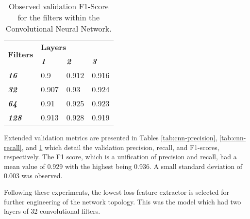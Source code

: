 \documentclass{article}
\begin{document}
\begin{table}[] \footnotesize
\centering
\caption{Observed validation F1-Score for the filters within the Convolutional Neural Network.}
\label{tab:cnn-f1}
\begin{tabular}{@{}llll@{}}
\toprule
\multirow{2}{*}{\textbf{Filters}} & \multicolumn{3}{l}{\textbf{Layers}}                             \\ \cmidrule(l){2-4} 
                                  & \textit{\textbf{1}} & \textit{\textbf{2}} & \textit{\textbf{3}} \\ \cmidrule(r){1-1}
\textit{\textbf{16}}              & 0.9                 & 0.912               & 0.916               \\
\textit{\textbf{32}}              & 0.907               & 0.93                & 0.924               \\
\textit{\textbf{64}}              & 0.91                & 0.925               & 0.923               \\
\textit{\textbf{128}}             & 0.913               & 0.928               & 0.919               \\ \bottomrule
\end{tabular}
\end{table}

Extended validation metrics are presented in Tables \ref{tab:cnn-precision}, \ref{tab:cnn-recall}, and \ref{tab:cnn-f1} which detail the validation precision, recall, and F1-scores, respectively. The F1 score, which is a unification of precision and recall, had a mean value of 0.929 with the highest being 0.936. A small standard deviation of 0.003 was observed. 

Following these experiments, the lowest loss feature extractor is selected for further engineering of the network topology. This was the model which had two layers of 32 convolutional filters. 
\end{document}
